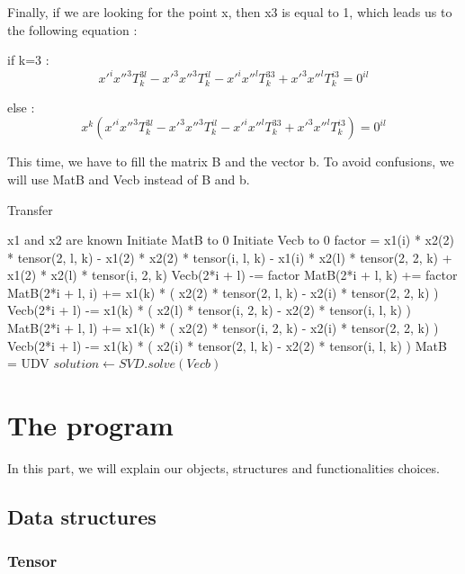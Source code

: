 \documentclass[a4paper,10pt]{report}
\begin{document}
Finally, if we are looking for the point x, then x3 is equal to 1, which leads us to the following equation :

if k=3 :
\[x'^{i}x''^{3}T^{3l}_{k} - x'^{3}x''^{3}T^{il}_{k} - x'^{i}x''^{l}T^{33}_{k} + x'^{3}x''^{l}T^{i3}_{k} = 0^{il}\]

else :
\[x^{k}(x'^{i}x''^{3}T^{3l}_{k} - x'^{3}x''^{3}T^{il}_{k} - x'^{i}x''^{l}T^{33}_{k} + x'^{3}x''^{l}T^{i3}_{k}) = 0^{il}\]

This time, we have to fill the matrix B and the vector b. To avoid confusions, we will use MatB and Vecb instead of B and b.

\begin{algorithm}
\caption{Transfer}
\begin{algorithmic}
\REQUIRE x1 and x2 are known
\STATE Initiate MatB to 0
\STATE Initiate Vecb to 0
\STATE factor = x1(i) * x2(2) * tensor(2, l, k) - x1(2) * x2(2) * tensor(i, l, k) - x1(i) * x2(l) * tensor(2, 2, k) + x1(2) * x2(l) * tensor(i, 2, k)
\STATE Vecb(2*i + l) -= factor
\ELSE
\STATE MatB(2*i + l, k) += factor
\ENDIF
{}
\STATE MatB(2*i + l, i) += x1(k) * ( x2(2) * tensor(2, l, k) - x2(i) * tensor(2, 2, k) )
\STATE Vecb(2*i + l) -= x1(k) * ( x2(l) * tensor(i, 2, k) - x2(2) * tensor(i, l, k) )
\STATE MatB(2*i + l, l) += x1(k) * ( x2(2) * tensor(i, 2, k) - x2(i) * tensor(2, 2, k) )
\STATE Vecb(2*i + l) -= x1(k) * ( x2(i) * tensor(2, l, k) - x2(2) * tensor(i, l, k) )
\ENDIF
\ENDFOR
\ENDFOR
\ENDFOR
\STATE MatB = UDV 
\STATE $solution \leftarrow SVD.solve(Vecb)$
\end{algorithmic}
\end{algorithm}


\chapter{The program}

In this part, we will explain our objects, structures and functionalities choices.
\\

\section{Data structures}
\subsection{Tensor}
\end{document}
